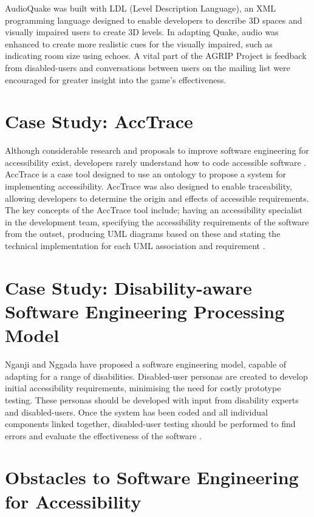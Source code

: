 \documentclass{scrartcl}
\begin{document}
AudioQuake was built with LDL (Level Description Language), an XML programming language designed to enable developers to describe 3D spaces and visually impaired users to create 3D levels. In adapting Quake, audio was enhanced to create more realistic cues for the visually impaired, such as indicating room size using echoes. A vital part of the AGRIP Project is feedback from disabled-users and conversations between users on the mailing list were encouraged for greater insight into the game's effectiveness.

\section{Case Study: AccTrace}

Although considerable research and proposals to improve software engineering for accessibility exist, developers rarely understand how to code accessible software \cite{12} . AccTrace is a case tool designed to use an ontology to propose a system for implementing accessibility. AccTrace was also designed to enable traceability, allowing developers to determine the origin and effects of accessible requirements. The key concepts of the AccTrace tool include; having an accessibility specialist in the development team, specifying the accessibility requirements of the software from the outset, producing UML diagrams based on these and stating the technical implementation for each UML association and requirement \cite{12}.

\section{Case Study: Disability-aware Software Engineering Processing Model}

Nganji and Nggada \cite{15} have proposed a software engineering model, capable of adapting for a range of disabilities. Disabled-user personas are created to develop initial accessibility requirements, minimising the need for costly prototype testing. These personas should be developed with input from disability experts and disabled-users. Once the system has been coded and all individual components linked together, disabled-user testing should be performed to find errors and evaluate the effectiveness of the software \cite{15}.

\section{Obstacles to Software Engineering for Accessibility}
\end{document}
